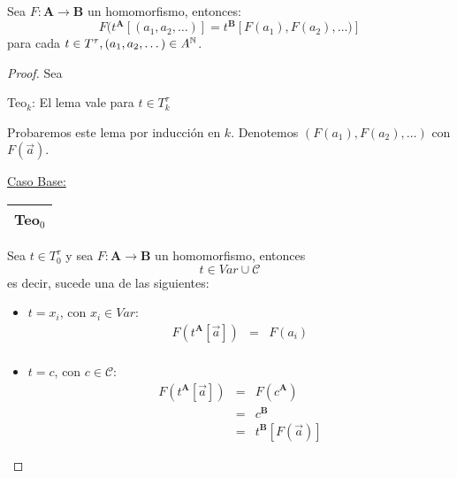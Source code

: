   \begin{lemma} \label{lemma_48}
    \PN Sea $F: \mathbf{A} \rightarrow \mathbf{B}$ un homomorfismo, entonces:
    \[
      F(t^{\mathbf{A}}[(a_{1}, a_{2}, \dotsc)] = t^{\mathbf{B}}[F(a_{1}), F(a_{2}), \dotsc)]
    \]
    \PN para cada $t \in T^{\tau}, (a_{1}, a_{2}, \dotsc) \in A^{\mathbb{N}}$.
  \end{lemma}
  \begin{proof}
    \PN Sea
    \begin{center}
      Teo$_{k}$: El lema vale para $t \in T_{k}^{\tau}$
    \end{center}
    \PN Probaremos este lema por inducción en $k$. Denotemos $(F(a_{1}), F(a_{2}), \dotsc)$ con $F(\vec{a})$.

    \vspace{3mm}
    \PN \underline{Caso Base:} \begin{tabular}{|c|} \hline Teo$_{0}$ \\\hline \end{tabular} Sea $t \in T_{0}^{\tau}$ y
    sea $F: \mathbf{A} \rightarrow \mathbf{B}$ un homomorfismo, entonces
    \[
      t \in Var \cup \mathcal{C}
    \]
    \PN es decir, sucede una de las siguientes:
    \begin{itemize}
      \item $t = x_{i}$, con $x_{i} \in Var$:
      \begin{eqnarray*}
        F(t^{\mathbf{A}}[\vec{a}]) &=& F(a_{i}) \\
      \end{eqnarray*}
      \item $t = c$, con $c \in \mathcal{C}$:
      \begin{eqnarray*}
        F(t^{\mathbf{A}}[\vec{a}]) &=& F(c^{\mathbf{A}}) \\
        &=& c^{\mathbf{B}} \\
        &=& t^{\mathbf{B}}[F(\vec{a})]
      \end{eqnarray*}
    \end{itemize}


\end{proof}
